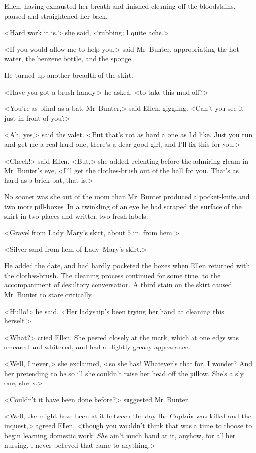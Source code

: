Ellen, having exhausted her breath and finished cleaning off the bloodstains, paused and straightened her back.

<Hard work it is,> she said, <rubbing; I quite ache.>

<If you would allow me to help you,> said Mr~Bunter, appropriating the hot water, the benzene bottle, and the sponge.

He turned up another breadth of the skirt.

<Have you got a brush handy,> he asked, <to take this mud off?>

<You're as blind as a bat, Mr~Bunter,> said Ellen, giggling. <Can't you see it just in front of you?>

<Ah, yes,> said the valet. <But that's not as hard a one as I'd like.  Just you run and get me a real hard one, there's a dear good girl, and I'll fix this for you.>

<Cheek!> said Ellen. <But,> she added, relenting before the admiring gleam in Mr~Bunter's eye, <I'll get the clothes-brush out of the hall for you. That's as hard as a brick-bat, that is.>

No sooner was she out of the room than Mr~Bunter produced a pocket-knife and two more pill-boxes. In a twinkling of an eye he had scraped the surface of the skirt in two places and written two fresh labels:

<Gravel from Lady~Mary's skirt, about 6 in. from hem.>

<Silver sand from hem of Lady~Mary's skirt.>

He added the date, and had hardly pocketed the boxes when Ellen returned with the clothes-brush. The cleaning process continued for some time, to the accompaniment of desultory conversation. A third stain on the skirt caused Mr~Bunter to stare critically.

<Hullo!> he said. <Her ladyship's been trying her hand at cleaning this herself.>

<What?> cried Ellen. She peered closely at the mark, which at one edge was smeared and whitened, and had a slightly greasy appearance.

<Well, I never,> she exclaimed, <so she has! Whatever's that for, I wonder? And her pretending to be so ill she couldn't raise her head off the pillow. She's a sly one, she is.>

<Couldn't it have been done before?> suggested Mr~Bunter.

<Well, she might have been at it between the day the Captain was killed and the inquest,> agreed Ellen, <though you wouldn't think that was a time to choose to begin learning domestic work. \emph{She} ain't much hand at it, anyhow, for all her nursing. I never believed that came to anything.>

